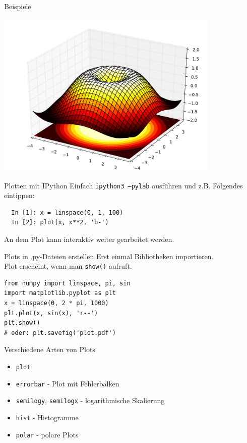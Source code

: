 \begin{frame}{Beispiele}
  \begin{center}
    \includegraphics[width=0.8\textwidth]{img/matplotlib/mplot3d.pdf}
  \end{center}
\end{frame}

\begin{frame}[fragile]{Plotten mit IPython}
  Einfach \texttt{ipython3 --pylab} ausführen und z.B. Folgendes eintippen:
\begin{verbatim}
  In [1]: x = linspace(0, 1, 100)
  In [2]: plot(x, x**2, 'b-')
\end{verbatim}
  An dem Plot kann interaktiv weiter gearbeitet werden.
\end{frame}

\begin{frame}[fragile]{Plots in .py-Dateien erstellen}
  Erst einmal Bibliotheken importieren.\\
  Plot erscheint, wenn man \texttt{show()} aufruft.
\begin{verbatim}
from numpy import linspace, pi, sin
import matplotlib.pyplot as plt
x = linspace(0, 2 * pi, 1000)
plt.plot(x, sin(x), 'r--')
plt.show()
# oder: plt.savefig('plot.pdf')
\end{verbatim}
\end{frame}

\begin{frame}{Verschiedene Arten von Plots}
  \begin{itemize}
    \item \texttt{plot}
    \item \texttt{errorbar} - Plot mit Fehlerbalken
    \item \texttt{semilogy}, \texttt{semilogx} - logarithmische Skalierung
    \item \texttt{hist} - Histogramme
    \item \texttt{polar} - polare Plots
  \end{itemize}
\end{frame}

